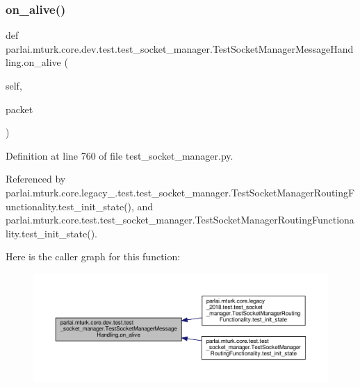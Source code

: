 \subsubsection{\texorpdfstring{on\+\_\+alive()}{on\_alive()}}
{\footnotesize\ttfamily def parlai.\+mturk.\+core.\+dev.\+test.\+test\+\_\+socket\+\_\+manager.\+Test\+Socket\+Manager\+Message\+Handling.\+on\+\_\+alive (\begin{DoxyParamCaption}\item[{}]{self,  }\item[{}]{packet }\end{DoxyParamCaption})}



Definition at line 760 of file test\+\_\+socket\+\_\+manager.\+py.



Referenced by parlai.\+mturk.\+core.\+legacy\+\_.\+test.\+test\+\_\+socket\+\_\+manager.\+Test\+Socket\+Manager\+Routing\+Functionality.\+test\+\_\+init\+\_\+state(), and parlai.\+mturk.\+core.\+test.\+test\+\_\+socket\+\_\+manager.\+Test\+Socket\+Manager\+Routing\+Functionality.\+test\+\_\+init\+\_\+state().

Here is the caller graph for this function\+:
\nopagebreak
\begin{figure}[H]
\begin{center}
\leavevmode
\includegraphics[width=350pt]{classparlai_1_1mturk_1_1core_1_1dev_1_1test_1_1test__socket__manager_1_1TestSocketManagerMessageHandling_a7e5074f665782799e088ae7328d62439_icgraph}
\end{center}
\end{figure}
\mbox{\label{classparlai_1_1mturk_1_1core_1_1dev_1_1test_1_1test__socket__manager_1_1TestSocketManagerMessageHandling_a01ca2d8b51911eb2e930dd44cdae1185}} 

